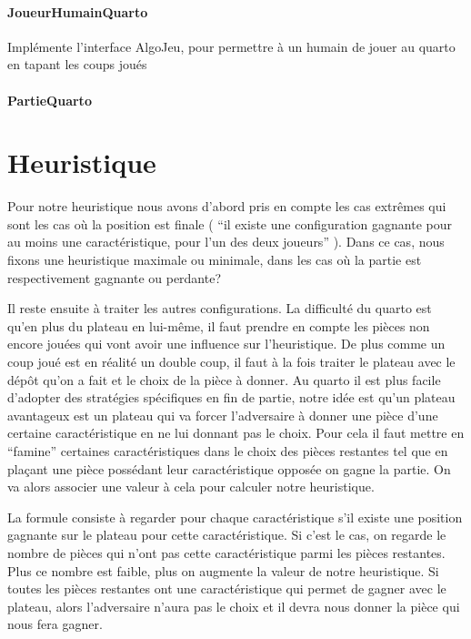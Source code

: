 \documentclass{article}
\begin{document}
\paragraph{JoueurHumainQuarto}
Implémente l'interface AlgoJeu, pour permettre à un humain de jouer au
quarto en tapant les coups joués

\paragraph{PartieQuarto}

\section{Heuristique}
Pour notre heuristique nous avons d'abord pris en compte les cas 
extrêmes qui sont les cas o\`u la position est finale
( ``il existe une configuration gagnante pour au moins une
caractéristique, pour l'un des deux joueurs'' ).
Dans ce cas, nous fixons une heuristique maximale ou minimale, dans
les cas o\`u la partie est respectivement gagnante ou perdante?


Il reste ensuite à traiter les autres configurations.
La difficulté du quarto est qu'en plus du plateau en lui-même,
il faut prendre en compte les pièces
non encore jouées qui vont avoir une influence sur l'heuristique.
De plus comme un coup joué est en réalité un double coup, il faut à la fois
traiter le plateau avec le dépôt qu'on a fait et le choix de la pièce
à donner.
Au quarto il est plus facile d'adopter des stratégies
spécifiques en fin de partie, notre idée est qu’un plateau avantageux
est un plateau qui va forcer l'adversaire à donner une pièce d'une
certaine caractéristique en ne lui donnant pas le choix. Pour cela il
faut mettre en ``famine'' certaines caractéristiques dans le choix des
pièces restantes tel que en plaçant une pièce possédant leur
caractéristique opposée on gagne la partie. On va alors associer une
valeur à cela pour calculer notre heuristique.


La formule consiste à regarder pour chaque caractéristique s’il existe
une position gagnante sur le plateau pour cette caractéristique. Si
c'est le cas, on regarde le nombre de pièces qui n'ont pas cette
caractéristique parmi les pièces restantes. Plus ce nombre est
faible, plus on augmente la valeur de notre heuristique.
Si toutes les pièces restantes ont une caractéristique qui permet
de gagner avec le
plateau, alors l'adversaire n'aura pas le choix et il devra nous
donner la pièce qui nous fera gagner.
\end{document}
